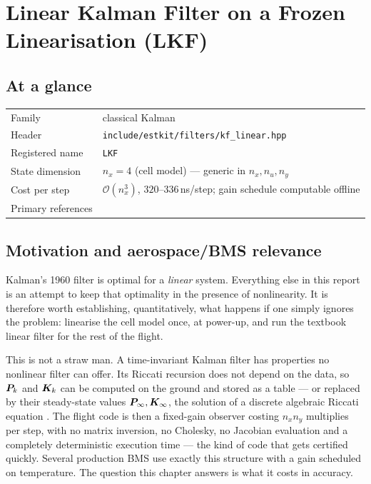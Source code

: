 \chapter{Linear Kalman Filter on a Frozen Linearisation (LKF)}
\label{ch:lkf}

\section*{At a glance}
\begin{tabular}{@{}l>{\raggedright\arraybackslash}p{}@{}}
Family & classical Kalman \\
Header & \texttt{include/estkit/filters/kf\_linear.hpp} \\
Registered name & \texttt{LKF} \\
State dimension & $n_x = 4$ (cell model) --- generic in $n_x, n_u, n_y$ \\
Cost per step & $\mathcal{O}(n_x^3)$, $320$--$336$\,ns/step; gain schedule computable offline \\
Primary references & \cite{kalman1960,kalmanbucy1961,andersonmoore1979,sorenson1970gauss} \\
\end{tabular}

\section{Motivation and aerospace/BMS relevance}
Kalman's 1960 filter is optimal for a \emph{linear} system. Everything else in this report is
an attempt to keep that optimality in the presence of nonlinearity. It is therefore worth
establishing, quantitatively, what happens if one simply ignores the problem: linearise the
cell model once, at power-up, and run the textbook linear filter for the rest of the flight.

This is not a straw man. A time-invariant Kalman filter has properties no nonlinear filter
can offer. Its Riccati recursion does not depend on the data, so $\bm{P}_k$ and $\bm{K}_k$ can be
computed on the ground and stored as a table --- or replaced by their steady-state values
$\bm{P}_\infty, \bm{K}_\infty$, the solution of a discrete algebraic Riccati equation
\cite[\S4.4]{andersonmoore1979}. The flight code is then a fixed-gain observer costing
$n_x n_y$ multiplies per step, with no matrix inversion, no Cholesky, no Jacobian evaluation
and a completely deterministic execution time --- the kind of code that gets certified
quickly. Several production BMS use exactly this structure with a gain scheduled on
temperature. The question this chapter answers is what it costs in accuracy.

